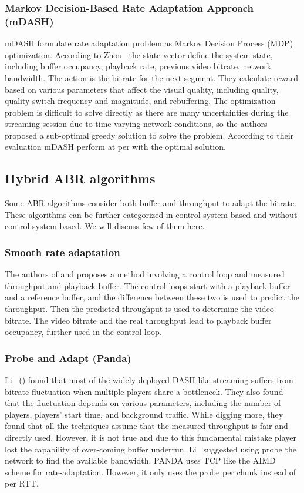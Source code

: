 \subsubsection{Markov Decision-Based Rate Adaptation Approach (mDASH)}
mDASH\cite{7393865} formulate rate adaptation problem as Markov Decision Process (MDP)\cite{P-1066} optimization. According to Zhou \etal\, the state vector define the system state, including buffer occupancy, playback rate, previous video bitrate, network bandwidth. The action is the bitrate for the next segment. They calculate reward based on various parameters that affect the visual quality, including quality, quality switch frequency and magnitude, and rebuffering. The optimization problem is difficult to solve directly as there are many uncertainties during the streaming session due to time-varying network conditions, so the authors proposed a sub-optimal greedy solution to solve the problem. According to their evaluation mDASH perform at per with the optimal solution.

\subsection{Hybrid ABR algorithms}
Some ABR algorithms consider both buffer and throughput to adapt the bitrate. These algorithms can be further categorized in control system based and without control system based. We will discuss few of them here.

\subsubsection{Smooth rate adaptation}
The authors of \cite{10.1145/2413176.2413190} and \cite{6694183} proposes a method involving a control loop and measured throughput and playback buffer. The control loops start with a playback buffer and a reference buffer, and the difference between these two is used to predict the throughput. Then the predicted throughput is used to determine the video bitrate. The video bitrate and the real throughput lead to playback buffer occupancy, further used in the control loop.

\subsubsection{Probe and Adapt (Panda)}
Li \etal\ (\cite{140405}) found that most of the widely deployed DASH like streaming suffers from bitrate fluctuation when multiple players share a bottleneck. They also found that the fluctuation depends on various parameters, including the number of players, players' start time, and background traffic. While digging more, they found that all the techniques assume that the measured throughput is fair and directly used. However, it is not true and due to this fundamental mistake player lost the capability of over-coming buffer underrun. Li \etal\ suggested using probe the network to find the available bandwidth. PANDA uses TCP like the AIMD scheme for rate-adaptation. However, it only uses the probe per chunk instead of per RTT.

